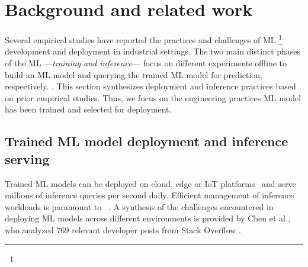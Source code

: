 \section{Background and related work}
\label{sec: background and related work}

Several empirical studies have reported the practices and challenges of ML \DIFdelbegin {}\DIFdelend \DIFaddbegin {}\footnote{} \DIFaddend development and deployment in industrial settings. The two main distinct phases of the ML \DIFdelbegin {}\DIFdelend \DIFaddbegin {}\DIFaddend ---\textit{training and inference}--- focus on \DIFdelbegin {}\DIFdelend \DIFaddbegin {}\DIFaddend different experiments offline to build an ML model and querying the trained ML model for prediction, respectively. \DIFdelbegin {}\DIFdelend \DIFaddbegin {}\DIFaddend . This section synthesizes deployment and inference practices based on prior empirical studies. Thus, we focus on \DIFaddbegin {}\DIFaddend the engineering practices \DIFdelbegin {}\DIFdelend \DIFaddbegin {}\DIFaddend ML model has been trained and selected for deployment.

\subsection{Trained ML model deployment and inference serving}
\label{subsec: trained ML model deployment}
Trained ML \DIFdelbegin {}\DIFdelend models can be deployed on cloud, edge or IoT platforms~\cite{Hazelwood-FB, Wu-FB-edge} and serve millions of inference queries per second daily. Efficient management of inference workloads is paramount to \DIFdelbegin {}\DIFdelend \DIFaddbegin {}\DIFaddend ~\cite{Park, Boroumand}. A synthesis of the challenges encountered in deploying ML \DIFdelbegin {}\DIFdelend models across different environments is provided by Chen et al.\cite{Chen}, who analyzed 769 relevant developer posts from Stack Overflow \DIFaddbegin {}\DIFaddend .

